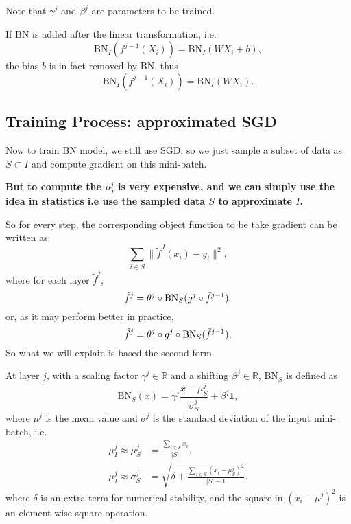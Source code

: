 Note that $\gamma^j$ and $\beta^j$ are parameters to be trained.

If BN is added after the linear transformation, i.e.
\begin{equation}
\text{BN}_I(f^{j-1}(X_i))=\text{BN}_{I}(WX_i + b),
\end{equation}
the bias $b$ is in fact removed by BN, thus
\begin{equation}
\text{BN}_I(f^{j-1}(X_i))=\text{BN}_I(WX_i).
\end{equation}


\subsection{Training Process:  approximated SGD}
Now to train BN model, we still use SGD, so we just sample a subset of data as $S \subset I$ and compute gradient on this mini-batch.  

{\bf But to compute the $\mu^j_I$ is very expensive, and we can simply use the idea in statistics i.e use the sampled data $S$ to approximate $I$.} 

So for every step, the corresponding object function to be take gradient can be written as:
\begin{equation}
	\sum_{i \in S} \|\tilde {f}^J(x_i) - y_i\|^2,
\end{equation}
where for each layer $\tilde f^j$,
\begin{equation}
\tilde f^j = \theta^j \circ \text{\text{BN}}_{S} ( g^j\circ\tilde f^{j-1}).
\end{equation}
or, as it may perform better in practice,
\begin{equation}
\tilde f^j = \theta^j \circ g^j \circ \text{\text{BN}}_{S} (\tilde f^{j-1}),
\end{equation}
So what we will explain is based the second form.

At layer $j$, with a scaling factor $\gamma^j\in\mathbb{R}$ and a shifting $\beta^j \in \mathbb{R}$, $\text{BN}_S$ is defined as
\begin{equation}
\text{BN}_{S}(x)= \gamma^j\frac{x - \mu_S^j}{\sigma_S^j}+\beta^j \bm{1},
\end{equation}
where $\mu^j$ is the mean value and $\sigma^j$ is the standard deviation of the input mini-batch, i.e.
\begin{align}
\mu^j_I \approx \mu_S^j &= \frac{\sum_{i\in S}  x_i }{|S|},\\
\mu_I^j \approx \sigma_S^j  &= \sqrt{ \delta + \frac{ \sum_{i\in S} ( x_i - \mu_S^j)^2}{|S|-1} }.
\end{align}
where $\delta$ is an extra term for numerical stability, and the square in $(  x_i - \mu^j)^2$ is an element-wise square operation.

